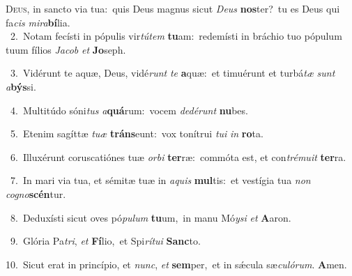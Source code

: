 \lettrine{\initial\textcolor{\initialcolor}{D}}{eus,} in sancto via tua:~\dagger quis Deus magnus sicut \textit{De}\-\textit{us} \textbf{nos}\-ter?~\star tu es Deus qui fa\textit{cis} \textit{mi}\-\textit{ra}\textbf{bí}lia.\\
{\numbfont\textcolor{\numbcolor}{~2.}}~Notam fecísti in pópulis vir\-\textit{tú}\-\textit{tem} \textbf{tu}\-am:~\star redemísti in bráchio tuo pópulum tuum fílios \textit{Ja}\-\textit{cob} \textit{et} \textbf{Jo}\-seph.\par
{\numbfont\textcolor{\numbcolor}{~3.}}~Vidérunt te aquæ, Deus, vidé\textit{runt} \textit{te} \textbf{a}\-quæ:~\star et timuérunt et turbá\textit{tæ} \textit{sunt} \textit{a}\-\textbf{býs}si.\par
{\numbfont\textcolor{\numbcolor}{~4.}}~Multitúdo sóni\textit{tus} \textit{a}\-\textbf{quá}rum:~\star vocem \textit{de}\-\textit{dé}\textit{runt} \textbf{nu}\-bes.\par
{\numbfont\textcolor{\numbcolor}{~5.}}~Etenim sagíttæ \textit{tu}\-\textit{æ} \textbf{tráns}\-eunt:~\star vox tonítrui \textit{tu}\-\textit{i} \textit{in} \textbf{ro}\-ta.\par
{\numbfont\textcolor{\numbcolor}{~6.}}~Illuxérunt coruscatiónes tuæ \textit{or}\-\textit{bi} \textbf{ter}\-ræ:~\star commóta est, et con\-\textit{tré}\-\textit{mu}\textit{it} \textbf{ter}\-ra.\par
{\numbfont\textcolor{\numbcolor}{~7.}}~In mari via tua, et sémitæ tuæ in \textit{a}\-\textit{quis} \textbf{mul}\-tis:~\star et vestígia tua \textit{non} \textit{co}\-\textit{gno}\textbf{scén}tur.\par
{\numbfont\textcolor{\numbcolor}{~8.}}~Deduxísti sicut oves pó\-\textit{pu}\-\textit{lum} \textbf{tu}\-um,~\star in manu Mó\-\textit{y}\-\textit{si} \textit{et} \textbf{A}\-aron.\par
{\numbfont\textcolor{\numbcolor}{~9.}}~Glória Pa\-\textit{tri}\-, \textit{et} \textbf{Fí}\-lio,~\star et Spi\-\textit{rí}\-\textit{tu}\textit{i} \textbf{Sanc}\-to.\par
{\numbfont\textcolor{\numbcolor}{10.}}~Sicut erat in princípio, et \textit{nunc}\-, \textit{et} \textbf{sem}\-per,~\star et in sǽcula sæ\-\textit{cu}\-\textit{ló}\textit{rum}. \textbf{A}\-men.\par
